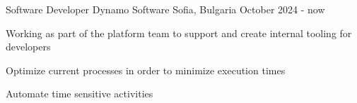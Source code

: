 

\begin{cventries}

  \cventry
    {Software Developer} %
    {Dynamo Software} %
    {Sofia, Bulgaria} %
    {October 2024 - now} %
    {
      \begin{cvitems} %
        \item {Working as part of the platform team to support and create  internal tooling for developers }
        \vspace{0.7em} %
          \item {Optimize current processes in order to minimize execution times }
        \vspace{0.7em} %
        \item {Automate time sensitive activities }
        \vspace{0.7em} %
      \end{cvitems}
    }


\end{cventries}
